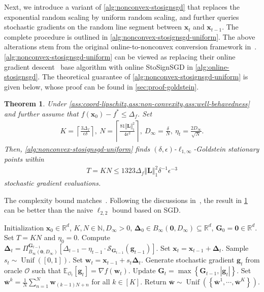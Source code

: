 \documentclass{article}
\newtheorem{thm}{Theorem}
\def \E {\mathbb{E}}
\def \x {\mathbf{x}}
\def \g {\mathbf{g}}
\def \O {\mathcal{O}}
\def \w {\mathbf{w}}
\def \R {\mathbb{R}}
\def \SS {\mathcal{S}}
\def \Gb {\mathbf{G}}
\def \Lb {\mathbf{L}}
\def \wb {\overline{\w}}
\def \N {\mathbb{N}}
\DeclareMathOperator*{\unif}{Unif}
\newcommand{\norm}[1]{\left\Vert#1\right\Vert}
\newcommand{\abs}[1]{\left|#1\right|}
\def \bDelta {\bm{\Delta}}
\newcommand{\sqbrac}[1]{\left[#1\right]}
\newcommand{\brac}[1]{\left(#1\right)}
\newcommand{\cbrac}[1]{\left\{#1\right\}}
\def\ceil#1{\left\lceil #1 \right\rceil}
\def\0{\bm{0}}
\begin{document}
Next, we introduce a variant of \cref{alg:nonconvex-stosignsgd} that replaces the exponential random scaling by uniform random scaling, and further queries stochastic gradients on the random line segment between $\x_t$ and $\x_{t-1}$. The complete procedure is outlined in \cref{alg:nonconvex-stosignsgd-uniform}. The above alterations stem from the original online-to-nonconvex conversion framework in~\citet[Algorithm~1]{cutkosky2023optimal}. \cref{alg:nonconvex-stosignsgd-uniform} can be viewed as replacing their online gradient descent~\citep{zinkevich2003oco} base algorithm with online StoSignSGD in \cref{alg:online-stosignsgd}. The theoretical guarantee of \cref{alg:nonconvex-stosignsgd-uniform} is given below, whose proof can be found in \cref{sec:proof-goldstein}.

\begin{thm}\label{thm:nonconvex-bound-unif}
    Under \cref{ass:coord-lipschitz,ass:non-convexity,ass:well-behavedness} and further assume that $f(\x_0)-f^*\le\Delta_f$. Set
    \begin{align*}
    K=\ceil{\frac{3\Delta_f}{\epsilon\delta}},\ N=\ceil{\frac{81\norm{\Lb}_1^2}{4\epsilon^{2}}},\  D_\infty=\frac{\delta}{N},\ \eta_t=\frac{2D_\infty}{\sqrt{N}}.
\end{align*}
Then, \cref{alg:nonconvex-stosignsgd-uniform} finds $(\delta,\epsilon)$-$\ell_{1,\infty}$-Goldstein stationary points within
\begin{align*}
    T=KN\le1323\Delta_f\norm{\Lb}_1^2\delta^{-1}\epsilon^{-3}
\end{align*}
stochastic gradient evaluations.
\end{thm}

The complexity bound matches~\citet[Theorem~13]{cutkosky2023optimal}. Following the discussions in~\citet[\S~4]{cutkosky2023optimal}, the result in \cref{thm:nonconvex-bound-unif} can be better than the naive $\ell_{2,2}$ bound based on SGD.

\begin{algorithm}[t]
   \caption{Non-smooth Non-convex StoSignSGD with Uniform Random Scaling}
   \label{alg:nonconvex-stosignsgd-uniform}
\begin{algorithmic}[1]
    Initialization $\x_0\in\R^d$, $K,N\in\N,D_\infty>0$, $\bDelta_0\in B_\infty(\0,D_\infty)\subseteq\R^d$, $\Gb_0=\0\in\R^d$.\\
   \STATE Set $T=KN$ and $\eta_0=0$.
   \STATE Compute $\bDelta_t=\Pi_{B_\infty(\0,D_\infty)}^{\Gb_{t-1}}\sqbrac{\Delta_{t-1}-\eta_{t-1}\cdot\SS_{\Gb_{t-1}}(\g_{t-1})}$.
   \STATE Set $\x_t=\x_{t-1}+\bDelta_t$.
   \STATE Sample $s_t\sim\unif([0,1])$.   
   \STATE Set $\w_t=\x_{t-1}+s_t\bDelta_t$.
   \STATE Generate stochastic gradient $\g_t$ from oracle $\O$ such that $\E_{\O_t}[\g_t]=\nabla f(\w_t)$.
   \STATE Update $\Gb_t=\max\cbrac{\Gb_{t-1},\abs{\g_t}}$.
   \ENDFOR
   \STATE Set $\wb^k=\frac{1}{N}\sum_{n=1}^N\w_{(k-1)N+n}$ for all $k\in[K]$.
    Return $\wb\sim\unif\brac{\cbrac{\wb^1,\cdots,\wb^K}}$.
\end{algorithmic}
\end{algorithm}
\end{document}
